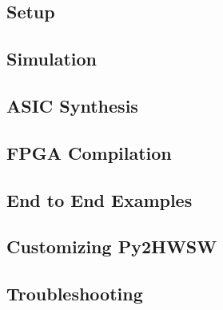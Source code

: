 \documentclass{ug}
\begin{document}
\subsection{Setup}
\label{sec:setup}


\subsection{Simulation}
\label{sec:sim}


\subsection{ASIC Synthesis}
\label{sec:synth}


\subsection{FPGA Compilation}
\label{sec:fpga}


\ifdefined\SECTIONCLEARPAGE
\clearpage
\fi
\subsection{End to End Examples}
\label{sec:examples}


\subsection{Customizing Py2HWSW}
\label{sec:customizing_py2}


\subsection{Troubleshooting}
\label{sec:troubleshooting}


%
%
% 

% 

% 
\end{document}
